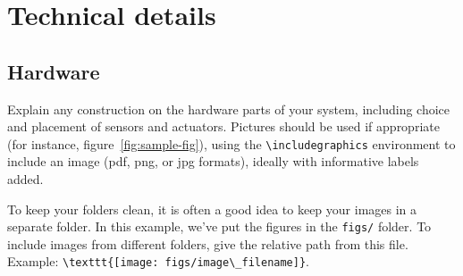 \documentclass{article}
\begin{document}



\section{Technical details}




\subsection{Hardware}

Explain any construction on the hardware parts of your system, including choice and placement of sensors and actuators. Pictures should be used if appropriate (for instance, figure~\ref{fig:sample-fig}), using the \verb+\includegraphics+ environment to include an image (pdf, png, or jpg formats), ideally with informative labels added. 

To keep your folders clean, it is often a good idea to keep your images in a separate folder. In this example, we've put the figures in the \texttt{figs/} folder. To include images from different folders, give the relative path from this file. Example: \verb+\texttt{[image: figs/image\_filename]}+.
\end{document}
